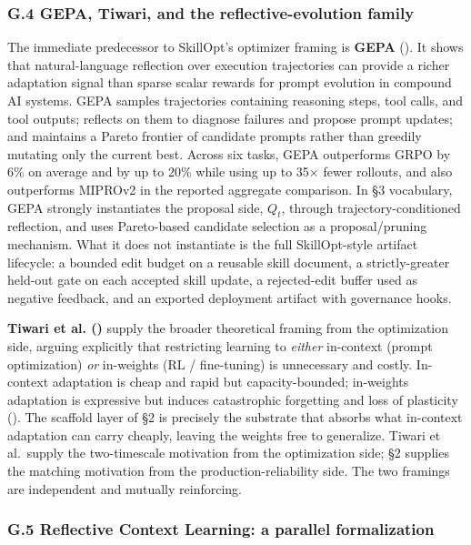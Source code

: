 \documentclass[
]{article}
\begin{document}
\subsubsection{G.4 GEPA, Tiwari, and the reflective-evolution
family}\label{g.4-gepa-tiwari-and-the-reflective-evolution-family}

The immediate predecessor to SkillOpt's optimizer framing is
\textbf{GEPA} (). It
shows that natural-language reflection over execution trajectories can
provide a richer adaptation signal than sparse scalar rewards for prompt
evolution in compound AI systems. GEPA samples trajectories containing
reasoning steps, tool calls, and tool outputs; reflects on them to
diagnose failures and propose prompt updates; and maintains a Pareto
frontier of candidate prompts rather than greedily mutating only the
current best. Across six tasks, GEPA outperforms GRPO by 6\% on average
and by up to 20\% while using up to 35× fewer rollouts, and also
outperforms MIPROv2 in the reported aggregate comparison. In §3
vocabulary, GEPA strongly instantiates the proposal side, \(Q_t\),
through trajectory-conditioned reflection, and uses Pareto-based
candidate selection as a proposal/pruning mechanism. What it does not
instantiate is the full SkillOpt-style artifact lifecycle: a bounded
edit budget on a reusable skill document, a strictly-greater held-out
gate on each accepted skill update, a rejected-edit buffer used as
negative feedback, and an exported deployment artifact with governance
hooks.

\textbf{Tiwari et al. ()}
supply the broader theoretical framing from the optimization side,
arguing explicitly that restricting learning to \emph{either} in-context
(prompt optimization) \emph{or} in-weights (RL / fine-tuning) is
unnecessary and costly. In-context adaptation is cheap and rapid but
capacity-bounded; in-weights adaptation is expressive but induces
catastrophic forgetting and loss of plasticity
(). The scaffold
layer of §2 is precisely the substrate that absorbs what in-context
adaptation can carry cheaply, leaving the weights free to generalize.
Tiwari et al.~supply the two-timescale motivation from the optimization
side; §2 supplies the matching motivation from the
production-reliability side. The two framings are independent and
mutually reinforcing.

\subsubsection{G.5 Reflective Context Learning: a parallel
formalization}\label{g.5-reflective-context-learning-a-parallel-formalization}
\end{document}
